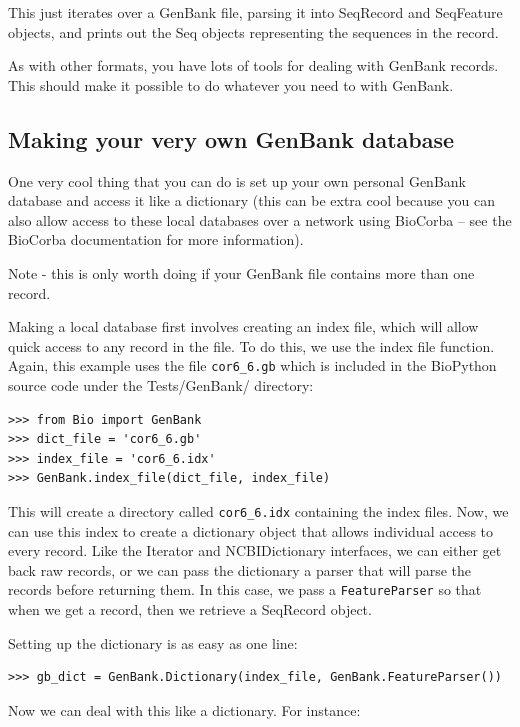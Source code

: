 \documentclass{report}
\begin{document}
This just iterates over a GenBank file, parsing it into SeqRecord and SeqFeature objects, and prints out the Seq objects representing the sequences in the record.

As with other formats, you have lots of tools for dealing with GenBank records. This should make it possible to do whatever you need to with GenBank.

\subsection{Making your very own GenBank database}

One very cool thing that you can do is set up your own personal GenBank database and access it like a dictionary (this can be extra cool because you can also allow access to these local databases over a network using BioCorba -- see the BioCorba documentation for more information).

Note - this is only worth doing if your GenBank file contains more than one record.

Making a local database first involves creating an index file, which will allow quick access to any record in the file. To do this, we use the index file function.
Again, this example uses the file \verb|cor6_6.gb| which is included in the BioPython source code under the Tests/GenBank/ directory:

\begin{verbatim}
>>> from Bio import GenBank
>>> dict_file = 'cor6_6.gb'
>>> index_file = 'cor6_6.idx'
>>> GenBank.index_file(dict_file, index_file)
\end{verbatim}

This will create a directory called \verb|cor6_6.idx| containing the index files. Now, we can use this index to create a dictionary object that allows individual access to every record. Like the Iterator and NCBIDictionary interfaces, we can either get back raw records, or we can pass the dictionary a parser that will parse the records before returning them. In this case, we pass a \verb|FeatureParser| so that when we get a record, then we retrieve a SeqRecord object. 


Setting up the dictionary is as easy as one line:

\begin{verbatim}
>>> gb_dict = GenBank.Dictionary(index_file, GenBank.FeatureParser())
\end{verbatim}

Now we can deal with this like a dictionary. For instance:
\end{document}

